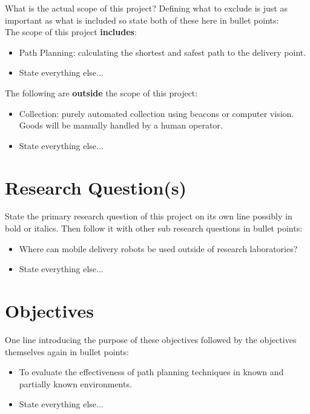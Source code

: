 \noindent
What is the actual scope of this project? Defining what to exclude is just as important as what is included so state both of these here in bullet points:\\

\noindent
The scope of this project \textbf{includes}:
\begin{itemize}
\item Path Planning: calculating the shortest and safest path to the delivery point.

\item State everything else...
\end{itemize}

\noindent
The following are \textbf{outside} the scope of this project:
\begin{itemize}
\item Collection: purely automated collection using beacons or computer vision. Goods will be manually handled by a human operator.

\item State everything else...
\end{itemize}


\section{Research Question(s)}

\noindent
State the primary research question of this project on its own line possibly in bold or italics. Then follow it with other sub research questions in bullet points:

\begin{itemize}
\item Where can mobile delivery robots be used outside of research laboratories?

\item State everything else...
\end{itemize}


\newpage

\section{Objectives}

\noindent
One line introducing the purpose of these objectives followed by the objectives themselves again in bullet points:

\begin{itemize}
\item To evaluate the effectiveness of path planning techniques in known and partially known environments.

\item State everything else...
\end{itemize}



